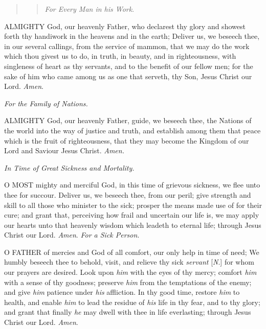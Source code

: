 \begin{quote}

\begin{quote}

\emph{For
Every Man in his Work}.

\end{quote}

\end{quote}

ALMIGHTY
God, our heavenly Father, who declarest thy glory and showest forth thy
handiwork in the heavens and in the earth; Deliver us, we beseech thee,
in our several callings, from the service of mammon, that we may do the
work which thou givest us to do, in truth, in beauty, and in righteousness,
with singleness of heart as thy servants, and to the benefit of our fellow
men; for the sake of him who came among us as one that serveth, thy Son,
Jesus Christ our Lord. \emph{Amen}.

\emph{For
the Family of Nations.}

ALMIGHTY
God, our heavenly Father, guide, we beseech thee, the Nations of the world
into the way of justice and truth, and establish among them that peace
which is the fruit of righteousness, that they may become the Kingdom
of our Lord and Saviour Jesus Christ. \emph{Amen.}

\emph{In Time of Great Sickness and Mortality.}

O
MOST mighty and merciful God, in this time of grievous sickness, we flee
unto thee for succour. Deliver us, we beseech thee, from our peril; give
strength and skill to all those who minister to the sick; prosper the
means made use of for their cure; and grant that, perceiving how frail
and uncertain our life is, we may apply our hearts unto that heavenly
wisdom which leadeth to eternal life; through Jesus Christ our Lord. \emph{Amen}.
\emph{For
a Sick Person}.

O
FATHER of mercies and God of all comfort, our only help in time of need;
We humbly beseech thee to behold, visit, and relieve thy sick \emph{servant}
[\emph{N}.] for whom our prayers are desired. Look upon \emph{him}
with the eyes of thy mercy; comfort \emph{him} with a sense of thy goodness;
preserve \emph{him} from the temptations of the enemy; and give \emph{him}
patience under \emph{his} affliction. In thy good time, restore \emph{him}
to health, and enable \emph{him} to lead the residue of \emph{his}
life in thy fear, and to thy glory; and grant that finally \emph{he}
may dwell with thee in life everlasting; through Jesus Christ our Lord.
\emph{Amen}.

